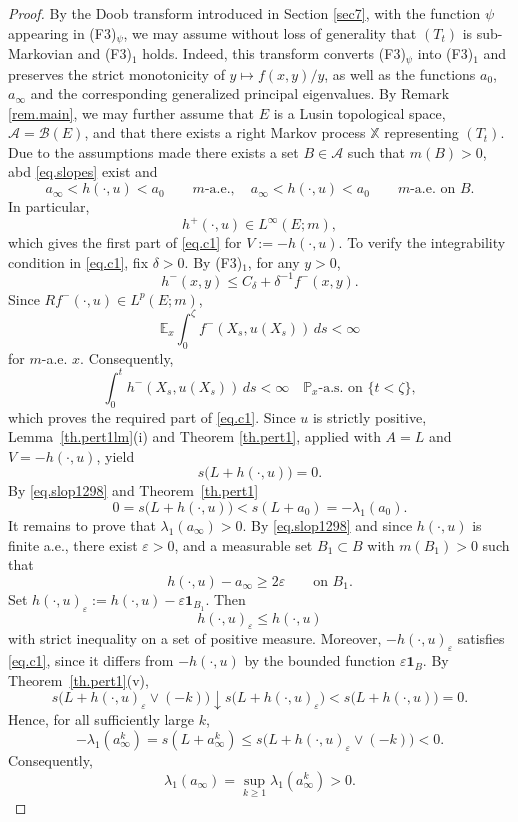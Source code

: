 \documentclass[11pt,a4paper,reqno]{amsart}
\theoremstyle{definition}
\numberwithin{equation}{section}
\begin{document}
\begin{proof}
By the Doob transform introduced in Section \ref{sec7}, with the
function $\psi$ appearing in \textup{(F3)$_\psi$}, we may assume
without loss of generality that $(T_t)$ is sub-Markovian and
\textup{(F3)$_1$} holds. Indeed, this transform converts
\textup{(F3)$_\psi$} into \textup{(F3)$_1$} and preserves
the strict monotonicity of $y\mapsto f(x,y)/y$, as well as
the functions $a_0$, $a_\infty$ and the corresponding generalized
principal eigenvalues.
By Remark \ref{rem.main}, we may further assume
that $E$ is a Lusin topological space, $\mathcal A=\mathcal B(E)$, and
that there exists a right Markov process $\mathbb X$ representing
$(T_t)$.
Due to the assumptions made there exists a set $B\in\mathcal A$ such that $m(B)>0$, abd
\eqref{eq.slopes} exist and
\begin{equation}
\label{eq.slop1298}
a_\infty<h(\cdot,u)<a_0 \qquad m\text{-a.e.},\quad a_\infty<h(\cdot,u)<a_0 \qquad m\text{-a.e. on }B.
\end{equation}
In particular,
\[
h^+(\cdot,u)\in L^\infty(E;m),
\]
which gives  the first part of \eqref{eq.c1} for $V:=-h(\cdot,u)$.
To verify the integrability condition in \eqref{eq.c1}, fix $\delta>0$.
By \textup{(F3)$_1$}, for any  $y>0$,
\[
h^-(x,y)\le C_\delta+\delta^{-1}f^-(x,y).
\]
Since $Rf^-(\cdot,u)\in L^p(E;m)$, 
\[
\mathbb E_x\int_0^\zeta f^-(X_s,u(X_s))\,ds<\infty
\]
for $m$-a.e. $x$. Consequently,
\[
\int_0^t h^-(X_s,u(X_s))\,ds<\infty\quad\mathbb P_x\text{-a.s. on }\{t<\zeta\},
\]
which proves the required part of \eqref{eq.c1}.
Since $u$ is strictly positive, Lemma~\ref{th.pert1lm}(i) and Theorem \ref{th.pert1}, applied
with $A=L$ and $V=-h(\cdot,u)$, yield
\[
s\bigl(L+h(\cdot,u)\bigr)=0.
\]
By \eqref{eq.slop1298} and Theorem~\ref{th.pert1}
\[
0=s\bigl(L+h(\cdot,u)\bigr)<s(L+a_0)=-\lambda_1(a_0).
\]
It remains to prove that $\lambda_1(a_\infty)>0$.
By \eqref{eq.slop1298} and since  $h(\cdot,u)$ is finite a.e., 
there exist $\varepsilon>0$, 
and a measurable set $B_1\subset B$ with $m(B_1)>0$ such that
\[
h(\cdot,u)-a_\infty\ge 2\varepsilon \qquad\text{on }B_1.
\]
Set $h(\cdot,u)_\varepsilon:=h(\cdot,u)-\varepsilon\mathbf1_{B_1}$.
Then
\[
h(\cdot,u)_\varepsilon\le h(\cdot,u)
\]
with strict inequality on a set of positive measure. Moreover,
$-h(\cdot,u)_\varepsilon$ satisfies \eqref{eq.c1}, since it differs from
$-h(\cdot,u)$ by the bounded function $\varepsilon\mathbf1_B$.
By Theorem~\ref{th.pert1}(v),
\[
s\bigl(L+h(\cdot,u)_\varepsilon\vee(-k)\bigr)\downarrow s\bigl(L+h(\cdot,u)_\varepsilon\bigr)<s\bigl(L+h(\cdot,u)\bigr)=0.
\]
Hence, for all sufficiently large $k$,
\[
-\lambda_1(a_\infty^k)=s(L+a_\infty^k)\le s\bigl(L+h(\cdot,u)_\varepsilon\vee(-k)\bigr)<0.
\]
Consequently,
\[
\lambda_1(a_\infty)=\sup_{k\ge1}\lambda_1(a_\infty^k)>0.
\]
\end{proof}
\end{document}
